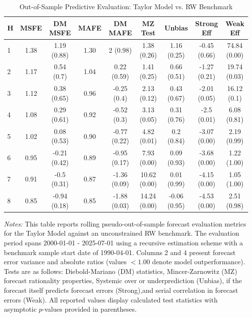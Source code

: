 \begin{table}[htbp]
\centering
\caption{Out-of-Sample Predictive Evaluation: Taylor Model vs. RW Benchmark}
\label{tab:taylor_model_evaluation}
\footnotesize
\begin{tabular}{l cccccccc}
\hline\hline
\rule{0pt}{3ex}
\textbf{H} & \textbf{MSFE} & \textbf{DM MSFE} & \textbf{MAFE} & \textbf{DM MAFE} & \textbf{MZ Test} & \textbf{Unbias} & \textbf{Strong Eff} & \textbf{Weak Eff} \\[0.5ex]
\hline
\rule{0pt}{2.5ex}
1 & 1.38 & 1.19 (0.88) & 1.30 & 2 (0.98) & 1.38 (0.26) & 1.16 (0.25) & -0.45 (0.66) & 74.84 (0.00) \\
2 & 1.17 & 0.54 (0.7) & 1.04 & 0.22 (0.59) & 1.41 (0.25) & 0.66 (0.51) & -1.27 (0.21) & 19.74 (0.03) \\
3 & 1.12 & 0.38 (0.65) & 0.96 & -0.25 (0.4) & 2.13 (0.12) & 0.43 (0.67) & -2.01 (0.05) & 16.12 (0.1) \\
4 & 1.08 & 0.29 (0.61) & 0.92 & -0.52 (0.3) & 3.13 (0.05) & 0.31 (0.76) & -2.5 (0.01) & 6.08 (0.81) \\
5 & 1.02 & 0.08 (0.53) & 0.90 & -0.77 (0.22) & 4.82 (0.01) & 0.2 (0.84) & -3.07 (0.00) & 2.19 (0.99) \\
6 & 0.95 & -0.21 (0.42) & 0.89 & -0.95 (0.17) & 7.93 (0.00) & 0.09 (0.93) & -3.68 (0.00) & 1.22 (1.00) \\
7 & 0.91 & -0.5 (0.31) & 0.87 & -1.36 (0.09) & 10.62 (0.00) & 0.01 (0.99) & -4.15 (0.00) & 1.05 (1.00) \\
8 & 0.85 & -0.94 (0.18) & 0.85 & -1.88 (0.03) & 14.24 (0.00) & -0.06 (0.95) & -4.53 (0.00) & 2.51 (0.98) \\
\hline\hline
\end{tabular}%
\par\smallskip
\parbox{\textwidth}{\scriptsize \textit{Notes:} This table reports rolling pseudo-out-of-sample forecast evaluation metrics for the Taylor Model against an unconstrained RW benchmark. The evaluation period spans 2000-01-01 - 2025-07-01 using a recursive estimation scheme with a benchmark sample start date of 1990-04-01. Columns 2 and 4 present forecast error variance and absolute ratios (values $< 1.00$ denote model outperformance). Tests are as follows: Diebold-Mariano (DM) statistics, Mincer-Zarnowitz (MZ) forecast rationality properties, Systemic over or underprediction (Unbias), if the forecast itself predicts forecast errors (Strong),and serial correlation in forecast errors (Weak). All reported values display calculated test statistics with asymptotic $p$-values provided in parentheses.}
\end{table}
